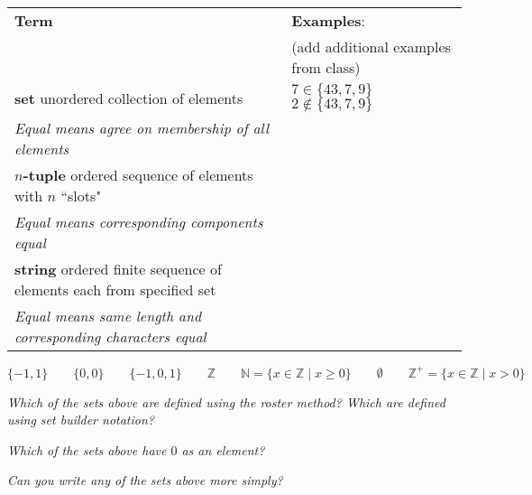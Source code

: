 
\begin{center}
    \begin{tabular}{p{4.4in}p{2.8in}}
    {\bf  Term} & {\bf Examples}:\\
    &  (add additional examples from class)\\
    \hline 
    {\bf set} \newline
    unordered collection of elements & $7 \in \{43, 7, 9 \}$ \qquad $2 \notin \{43, 7, 9 \}$ \\
    {\it Equal means agree on membership of all elements}& \\
    \hline
    {\bf $n$-tuple} \newline
    ordered sequence of elements with $n$ ``slots" & \\
    {\it Equal means corresponding components equal}& \\
    \hline
    {\bf string} \newline
    ordered finite sequence of elements each from specified
    set & \\
    {\it Equal means same length and corresponding characters equal}
    \end{tabular}
    \end{center}
    \[
    \{ -1, 1\} \qquad 
    \{0, 0 \} \qquad
    \{-1, 0, 1 \} \qquad
    \mathbb{Z} \qquad
    \mathbb{N} = \{ x \in \mathbb{Z} \mid x \geq 0 \} \qquad
    \emptyset \qquad
    \mathbb{Z}^+ = \{ x \in \mathbb{Z}  \mid x > 0 \}
    \]
    
    \vfill
    
    {\it Which of the sets above are defined using the roster method? Which are defined using set builder notation?}
    
    {\it Which of the sets above have $0$ as an element?}
    
    {\it Can you write any of the sets above more simply?}
    
    \vfill